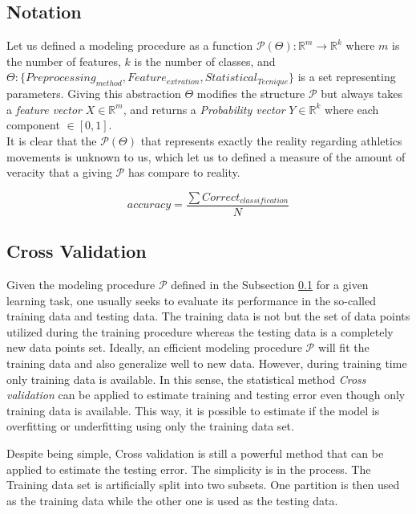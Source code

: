 \subsection{Notation} \label{notation}
Let us defined a modeling procedure as  a function $\mathcal{P}(\Theta): \mathbb{R}^{m} \longrightarrow \mathbb{R}^{k}$ where $m$ is the number of features, $k$ is the number of classes, and $\Theta : \{Preprocessing_{method}, Feature_{extration}, Statistical_{Tecnique} \}$ is a set representing parameters. Giving this abstraction $\Theta$ modifies the structure  $\mathcal{P}$ but always takes a \textit{feature vector} $X \in  \mathbb{R}^{m}$, and returns a \textit{Probability vector} $Y \in  \mathbb{R}^{k}$ where each component $\in  [0,1]$.\\

It is clear that the $\mathcal{P}(\Theta)$ that represents exactly the reality regarding athletics movements is unknown to us, which let us to defined a measure of the amount of veracity that a giving $\mathcal{P}$ has compare to reality.

\begin{equation}
accuracy=  \frac{\sum Correct_{classification}}{N}
\end{equation}

\subsection{Cross Validation}

Given the modeling procedure $\mathcal{P}$ defined in the Subsection \ref{notation}
for a given learning task, one usually seeks to evaluate its performance in the
so-called training data and testing data. The training data is not but the set of
data points utilized during the training procedure whereas the testing data is a
completely new data points set. Ideally, an efficient modeling procedure
$\mathcal{P}$ will fit the training data and also generalize well to new data.
However, during training time only training data is available. In this sense, the
statistical method \textit{Cross validation} can be applied to estimate training
and testing error even though only training data is available. This way, it is
possible to estimate if the model is overfitting or underfitting using only the
training data set.

Despite being simple, Cross validation is still a powerful method that can be
applied to estimate the testing error. The simplicity is in the process. The
Training data set is artificially split into two subsets. One partition is then
used as the training data while the other one is used as the testing data.

